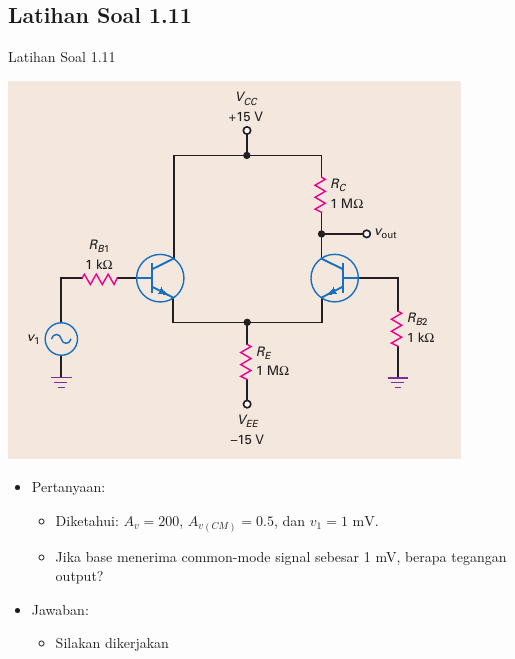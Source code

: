 \documentclass[aspectratio=169]{beamer}
\begin{document}
\subsection{Latihan Soal 1.11}
\begin{frame}{Latihan Soal 1.11}
	\begin{multicols}{2}
		\begin{center}
			\includegraphics[height=0.7\textheight]{gambar/01.fig22}
		\end{center}
		\columnbreak
		\begin{itemize}
			\item Pertanyaan:
			\begin{itemize}
				\item Diketahui: $ A_v = 200 $, $ A_{v(CM)} = 0.5 $, dan $ v_1 = 1 \text{ mV} $.
				\item Jika base menerima common-mode signal sebesar 1 mV, berapa tegangan output?
			\end{itemize}
			\item Jawaban:
			\begin{itemize}
				\item Silakan dikerjakan
			\end{itemize}
		\end{itemize}
	\end{multicols}
\end{frame}
\end{document}
